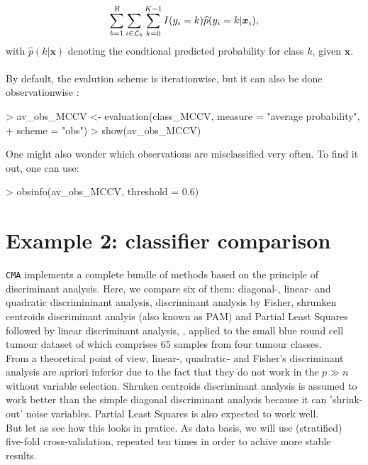 \begin{equation*}
\sum_{b=1}^B \sum_{i \in \mathcal L_b}  \sum_{k=0}^{K-1} I(y_i = k) \widehat{p}(y_i = k | \bm{x}_i), 
\end{equation*}
with $\widehat{p}(k|\bm{x})$ denoting the condtional predicted probability for class $k$,
given $\bm{x}$.\\
\\ 
By default, the evalution scheme is iterationwise, but it can also be done
observationwise :

\begin{Schunk}
\begin{Sinput}
> av_obs_MCCV <- evaluation(class_MCCV, measure = "average probability", 
+     scheme = "obs")
> show(av_obs_MCCV)
\end{Sinput}
\end{Schunk}

One might also wonder which observations are misclassified very often. To find
it out, one can use:

\begin{Schunk}
\begin{Sinput}
> obsinfo(av_obs_MCCV, threshold = 0.6)
\end{Sinput}
\end{Schunk}

\section{Example 2: classifier comparison}\label{sec:ex2}

\texttt{CMA} implements a complete bundle of methods based on the principle of
discriminant analysis. Here, we compare six of them:
diagonal-, linear- and quadratic discrimininant analysis, discriminant
analysis by Fisher, shrunken centroids discriminant analyis (also known
as PAM) and Partial Least Squares followed by linear discriminant analysis, 
, applied to the small blue round cell tumour dataset of \citet{Khan2001}
which comprises 65 samples from four tumour classes.\\ 
From a theoretical point of view, linear-, quadratic- and Fisher's discriminant
analysis are apriori inferior due to the fact that they do not work in the
$p \gg n$ without variable selection. Shruken centroids discriminant analysis
is assumed to work better than the simple diagonal discriminant analysis because
it can 'shrink-out' noise variables. Partial Least Squares is also expected to
work well.\\
But let as see how this looks in pratice. As data basis, we will use
(stratified) five-fold cross-validation, repeated ten times in order to
achive more stable results. 


